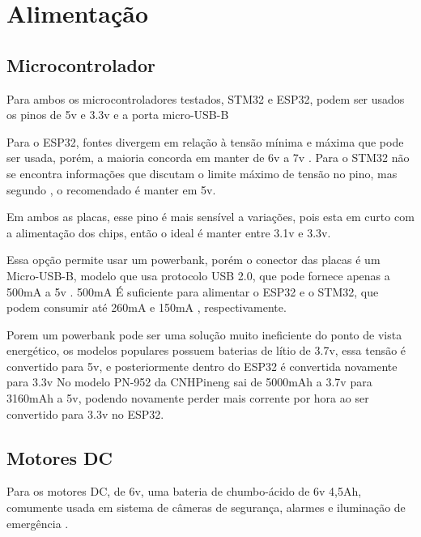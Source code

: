 
\section{Alimentação}


\subsection{Microcontrolador}

Para ambos os microcontroladores testados, STM32 e ESP32,
podem ser usados os pinos de 5v  e 3.3v e a porta micro-USB-B


Para o ESP32, fontes divergem em relação à tensão mínima e máxima 
que pode ser usada, porém, a maioria concorda em manter de
6v a 7v \cite{esp32_reference_power_supply_1,esp32_reference_power_supply_2, esp32_reference_2}.
Para o STM32 não se encontra informações que discutam o limite máximo de tensão no pino, mas segundo \cite{stm_doc},
o recomendado é manter em 5v.

Em ambos as placas, esse pino é mais sensível a variações, pois esta em curto com a alimentação
dos chips, então o ideal é manter entre 3.1v e 3.3v.

Essa opção permite usar um powerbank, porém o conector das placas é um Micro-USB-B,
modelo que usa protocolo USB 2.0, que pode fornece apenas a 500mA a 5v \cite{micro_usb_b}.
500mA É suficiente para alimentar o ESP32 e o STM32, que podem consumir 
até 260mA \cite{esp_max_current} e 150mA \cite{stm32_datasheet}, respectivamente.

Porem um powerbank pode ser uma solução muito ineficiente do ponto de vista energético,
os modelos populares possuem baterias de lítio de 3.7v, essa tensão é convertido para 5v,
e posteriormente dentro do ESP32 é convertida novamente para 3.3v
No modelo PN-952 da CNHPineng sai de 5000mAh a 3.7v  para 3160mAh a 5v,
podendo novamente perder mais corrente por hora ao ser convertido para 3.3v no ESP32.


\subsection{Motores DC}
Para os motores DC, de 6v, uma bateria de chumbo-ácido de 6v 4,5Ah, 
comumente usada em sistema de câmeras de segurança,
alarmes e iluminação de emergência \cite{bateria_6v_ref_1,bateria_6v_ref_2}.

